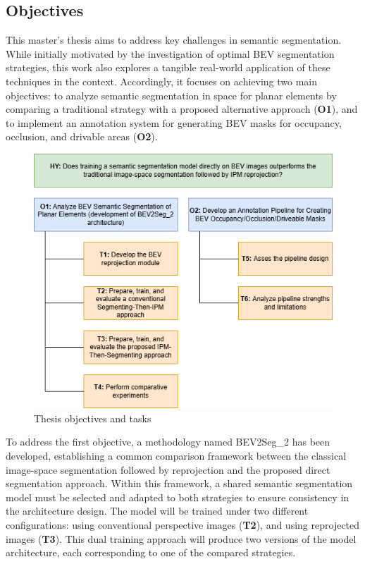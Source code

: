 \subsection{Objectives} \label{sec:objectives}
This master's thesis aims to address key challenges in  semantic segmentation. While initially motivated by the investigation of optimal BEV segmentation strategies, this work also explores a tangible real-world application of these techniques in the  context. Accordingly, it focuses on achieving two main objectives: to analyze semantic segmentation in  space for planar elements by comparing a traditional strategy with a proposed alternative approach (\textbf{O1}), and to implement an annotation system for generating BEV masks for occupancy, occlusion, and drivable areas (\textbf{O2}).

\begin{figure}[h!]
    \centering
    \includegraphics[width=0.8\linewidth]{./images/introduction/TFM_Objectives.png}
    \caption{Thesis objectives and tasks}
    \label{fig:objectives}
\end{figure}

To address the first objective, a methodology named BEV2Seg\_2 has been developed, establishing a common comparison framework between the classical image-space segmentation followed by  reprojection and the proposed direct  segmentation approach. Within this framework, a shared semantic segmentation model must be selected and adapted to both strategies to ensure consistency in the architecture design. The model will be trained under two different configurations: using conventional perspective images (\textbf{T2}), and using  reprojected images (\textbf{T3}). This dual training approach will produce two versions of the model architecture, each corresponding to one of the compared strategies.

